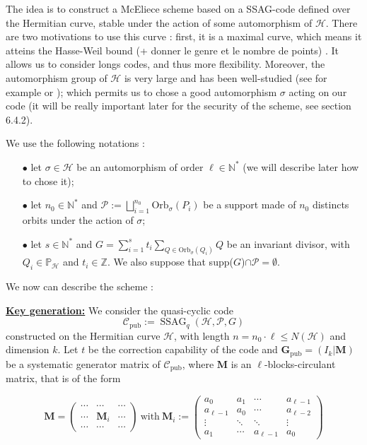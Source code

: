 \documentclass[10pt]{article}
\theoremstyle{definition}
\theoremstyle{definition}
\theoremstyle{definition}
\newcommand{\s}{\vspace{0.3cm}}
\newcommand{\cd}{\cdot}
\newcommand{\N}{\mathbb{N}}
\newcommand{\Z}{\mathbb{Z}}
\newcommand{\PP}{\mathbb{P}}
\newcommand{\PR}{\mathcal{P}}
\newcommand{\ssag}{\operatorname{SSAG}}
\begin{document}
The idea is to construct a McEliece scheme based on a SSAG-code defined over the Hermitian curve, stable under the action of some automorphism of $\mathcal{H}$. There are two motivations to use this curve : first, it is a maximal curve, \color{purple}which means it atteins the Hasse-Weil bound (+ donner le genre et le nombre de points) \color{black}. It allows us to consider longs codes, and thus more flexibility. Moreover, the automorphism group of $\mathcal{H}$ is very large and has been well-studied (see for example \cite{Sti} or \cite{Gar}); which permits us to chose a good automorphism $\sigma$ acting on our code (it will be really important later for the security of the scheme, see section 6.4.2). 

\s

We use the following notations : 
\begin{enumerate}
\item[$\bullet$] let $\sigma \in \mathcal{H}$ be an automorphism of order $\ell \in \N^*$ (we will describe later how to chose it);
\item[$\bullet$] let $n_0 \in \N^* $ and $\PR := \bigsqcup\limits_{i=1}^{n_0} \mathrm{Orb}_{\sigma}(P_i)$ be a support made of $n_0$ distincts orbits under the action of $\sigma$;
\item[$\bullet$] let $s \in \N^*$ and $G = \sum\limits_{i=1}^s t_i \sum\limits_{Q \in \mathrm{Orb}_{\sigma}(Q_i)} Q$ be an invariant divisor, with $Q_i \in \PP_{\mathcal{H}}$ and $t_i \in \Z$. We also suppose that supp($G$)$\cap \PR = \emptyset$.
\end{enumerate}

We now can describe the scheme :

\s 

\underline{\textbf{Key generation:}} We consider the quasi-cyclic code 
\[\mathcal{C}_{\mathrm{pub}} := \ssag_q(\mathcal{H},\PR,G)\]
constructed on the Hermitian curve $\mathcal{H}$, with length $n=n_0 \cd \ell\leq N(\mathcal{H})$ and dimension $k$. Let $t$ be the correction capability of the code and $\mathbf{G}_{\mathrm{pub}} = (I_k | \mathbf{M})$ be a systematic generator matrix of $\mathcal{C}_{\mathrm{pub}}$, where $\mathbf{M}$ is an \color{purple} $\ell$-blocks-circulant matrix, that is of the form 

\begin{equation*}
\mathbf{M}= \begin{pmatrix}
\cdots & \cdots & \cdots \\
\cdots & \mathbf{M}_i & \cdots \\
\cdots & \cdots & \cdots
\end{pmatrix}
\ \mathrm{with} \ \mathbf{M}_i := \begin{pmatrix}
a_0 & a_1 & \cdots & a_{\ell-1} \\
a_{\ell-1} & a_0 & \cdots & a_{\ell-2} \\
\vdots & \ddots & \ddots & \vdots \\
a_1 & \cdots & a_{\ell-1} & a_0 
\end{pmatrix}
\end{equation*}
\end{document}
